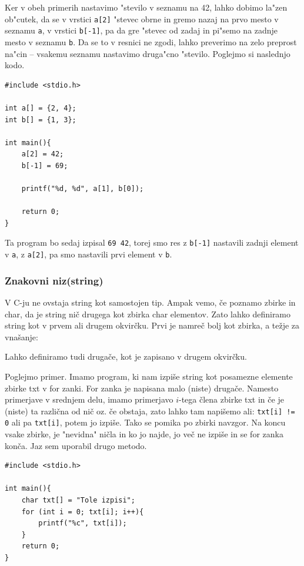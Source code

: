 \documentclass[a4paper, 12pt]{article}
\begin{document}
Ker v obeh primerih nastavimo "stevilo v seznamu na 42, lahko dobimo la"zen ob"cutek, da se v vrstici \lstinline|a[2]| "stevec obrne in gremo nazaj na prvo mesto v seznamu \texttt{a}, v vrstici \lstinline|b[-1]|, pa da gre "stevec od zadaj in pi"semo na zadnje mesto v seznamu \texttt{b}. Da se to v resnici ne zgodi, lahko preverimo na zelo preprost na"cin -- vsakemu seznamu nastavimo druga"cno "stevilo. Poglejmo si naslednjo kodo.

\begin{lstlisting}[caption = Zbirke primer]
#include <stdio.h>

int a[] = {2, 4};
int b[] = {1, 3};

int main(){
	a[2] = 42;
	b[-1] = 69;

	printf("%d, %d", a[1], b[0]);

	return 0;
}
\end{lstlisting}

Ta program bo sedaj izpisal \texttt{69 42}, torej smo res z \lstinline|b[-1]| nastavili zadnji element v \texttt{a}, z \lstinline|a[2]|, pa smo nastavili prvi element v \texttt{b}.
%
\subsubsection{Znakovni niz(string)}
V C-ju ne ovstaja string kot samostojen tip. Ampak vemo, če poznamo zbirke in char, da je string nič drugega kot zbirka char elementov. Zato lahko definiramo string kot v prvem ali drugem okvirčku. Prvi je namreč bolj kot zbirka, a težje za vnašanje:
\begin{center}
\end{center}

Lahko definiramo tudi drugače, kot je zapisano v drugem okvirčku.

Poglejmo primer. Imamo program, ki nam izpiše string kot posamezne elemente zbirke txt v for zanki. For zanka je napisana malo (niste) drugače. Namesto primerjave v srednjem delu, imamo primerjavo $i$-tega člena zbirke txt in če je (niste) ta različna od nič oz. če obstaja, zato lahko tam napišemo ali: \texttt{txt[i] != 0} ali pa \texttt{txt[i]}, potem jo izpiše. Tako se pomika po zbirki navzgor. Na koncu vsake zbirke, je "nevidna" ničla in ko jo najde, jo več ne izpiše in se for zanka konča. Jaz sem uporabil drugo metodo.

\begin{lstlisting}[caption = Znakovni niz: navajanje 1]
#include <stdio.h>

int main(){
	char txt[] = "Tole izpisi";
	for (int i = 0; txt[i]; i++){
		printf("%c", txt[i]);
	}
	return 0;
}
\end{lstlisting}
\end{document}
